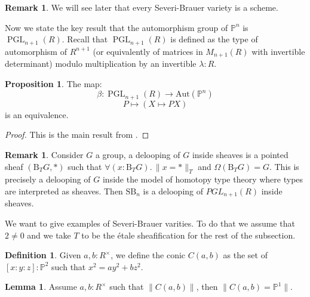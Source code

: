 \documentclass[10pt,a4paper]{article}
\theoremstyle{definition}
\newtheorem{lemma}[theorem]{Lemma}
\newtheorem{definition}[theorem]{Definition}
\newtheorem{remark}[theorem]{Remark}
\newtheorem{proposition}[theorem]{Proposition}
\DeclareMathOperator{\PGL}{PGL}
\newcommand{\SB}{\mathrm{SB}}
\newcommand{\propTrunc}[1]{\lVert #1 \rVert}
\newcommand{\bP}{\mathbb{P}}
\newcommand{\Aut}{\mathrm{Aut}}
\begin{document}
\begin{remark}
We will see later that every Severi-Brauer variety is a scheme. 
\end{remark}

Now we state the key result that the automorphism group of $\bP^n$ is $\PGL_{n+1}(R)$. Recall that $\PGL_{n+1}(R)$ is defined as the type of automorphism of $R^{n+1}$ (or equivalently of matrices in $M_{n+1}(R)$ with invertible determinant) modulo multiplication by an invertible $\lambda:R$.

\begin{proposition}\label{Aut-Pn-PGL}
The map:
\[\beta:\PGL_{n+1}(R)\to\Aut(\bP^n)\]
\[P\mapsto (X\mapsto PX)\]
is an equivalence.
\end{proposition}

\begin{proof}
This is the main result from \cite{sag-projective}.
\end{proof}

\begin{remark}\label{SB-is-delooping}
Consider $G$ a group, a delooping of $G$ inside sheaves is a pointed sheaf $(\mathrm{B}_TG,*)$ such that $\forall(x:\mathrm{B}_TG).\, \propTrunc{x=*}_T$ and $\Omega (\mathrm{B}_TG) = G$. This is precisely a delooping of $G$ inside the model of homotopy type theory where types are interpreted as sheaves. Then $\SB_n$ is a delooping of $PGL_{n+1}(R)$ inside sheaves.
\end{remark}

We want to give examples of Severi-Brauer varities. To do that we assume that $2\not=0$ and we take $T$ to be the étale sheafification for the rest of the subsection.

\begin{definition}
Given $a,b:R^\times$, we define the conic $C(a,b)$ as the set of $[x:y:z]:\bP^2$ such that $x^2=ay^2+bz^2$.
\end{definition}

\begin{lemma}\label{pointed-conics-projective}
Assume $a,b:R^\times$ such that $\propTrunc{C(a,b)}$, then $\propTrunc{C(a,b)=\bP^1}$.
\end{lemma}
\end{document}
